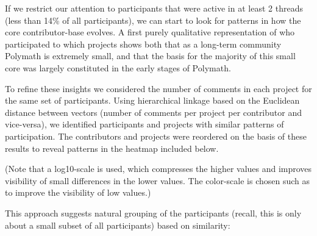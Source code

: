 \documentclass[article, floatfix, groupaddress, prb]{revtex4-1}
\begin{document}
    If we restrict our attention to participants that were active in at
least 2 threads (less than 14\% of all participants), we can start to
look for patterns in how the core contributor-base evolves. A first
purely qualitative representation of who participated to which projects
shows both that as a long-term community Polymath is extremely small,
and that the basis for the majority of this small core was largely
constituted in the early stages of Polymath.


    \begin{figure}
        \begin{center}\end{center}
        \caption{}
        \label{}
    \end{figure}
    

    \begin{figure}
        \begin{center}\end{center}
        \caption{}
        \label{}
    \end{figure}
    
    To refine these insights we considered the number of comments in each
project for the same set of participants. Using hierarchical linkage
based on the Euclidean distance between vectors (number of comments per
project per contributor and vice-versa), we identified participants and
projects with similar patterns of participation. The contributors and
projects were reordered on the basis of these results to reveal patterns
in the heatmap included below.

(Note that a log10-scale is used, which compresses the higher values and
improves visibility of small differences in the lower values. The
color-scale is chosen such as to improve the visibility of low values.)


    \begin{figure}
        \begin{center}\end{center}
        \caption{}
        \label{}
    \end{figure}
    
    This approach suggests natural grouping of the participants (recall,
this is only about a small subset of all participants) based on
similarity:
\end{document}
